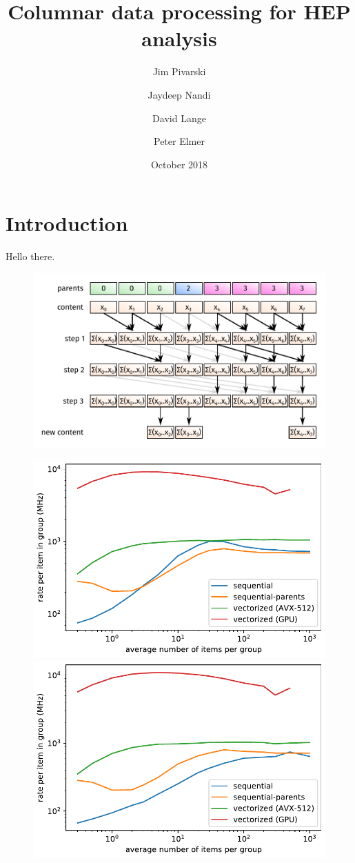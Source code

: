 \documentclass{webofc}
\title{Columnar data processing for HEP analysis}
\author{Jim Pivarski\inst{1} \and Jaydeep Nandi\inst{2} \and David Lange\inst{1} \and Peter Elmer\inst{1}}
\date{October 2018}
\begin{document}

\maketitle

\section{Introduction}

Hello there.


\begin{figure}
\begin{center}
\includegraphics[width=0.7\linewidth]{hillis-steele-3.pdf}
\end{center}

\caption{\label{hillis-steele-3}}
\end{figure}

\begin{figure}
\includegraphics[width=0.5\linewidth]{sum_rates_logy.pdf}\includegraphics[width=0.5\linewidth]{max_rates_logy.pdf}

\caption{\label{rates_logy}}
\end{figure}
\end{document}
